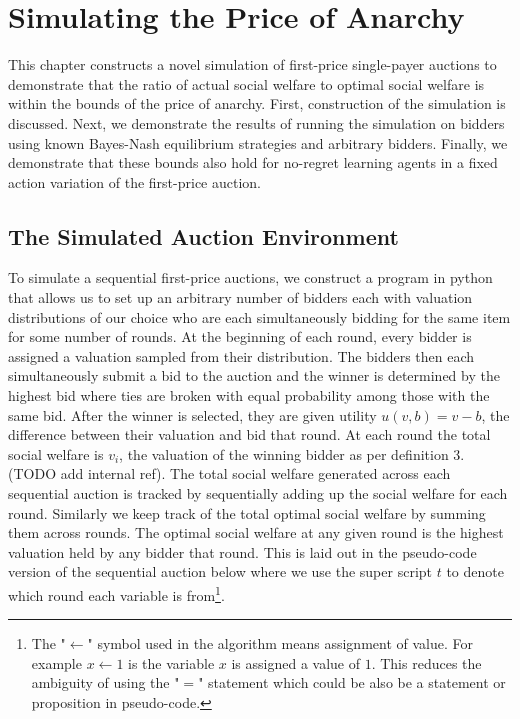 \documentclass[12pt,twoside]{reedthesis}
\begin{document}
\chapter{Simulating the Price of Anarchy}

This chapter constructs a novel simulation of first-price single-payer auctions to demonstrate that the ratio of actual social welfare to optimal social welfare is within the bounds of the price of anarchy. First, construction of the simulation is discussed. Next, we demonstrate the results of running the simulation on bidders using known Bayes-Nash equilibrium strategies and arbitrary bidders. Finally, we demonstrate that these bounds also hold for no-regret learning agents in a fixed action variation of the first-price auction.

\section{The Simulated Auction Environment}

To simulate a sequential first-price auctions, we construct a program in python that allows us to set up an arbitrary number of bidders each with valuation distributions of our choice who are each simultaneously bidding for the same item for some number of rounds. At the beginning of each round, every bidder is assigned a valuation sampled from their distribution. The bidders then each simultaneously submit a bid to the auction and the winner is determined by the highest bid where ties are broken with equal probability among those with the same bid. After the winner is selected, they are given utility $u(v, b) = v - b$, the difference between their valuation and bid that round. At each round the total social welfare is $v_i$, the valuation of the winning bidder as per definition 3. (TODO add internal ref). The total social welfare generated across each sequential auction is tracked by sequentially adding up the social welfare for each round. Similarly we keep track of the total optimal social welfare by summing them across rounds. The optimal social welfare at any given round is the highest valuation held by any bidder that round. This is laid out in the pseudo-code version of the sequential auction below where we use the super script $t$ to denote which round each variable is from\footnote{The "$\leftarrow$" symbol used in the algorithm means assignment of value. For example $x \leftarrow 1$ is the variable $x$ is assigned a value of $1$. This reduces the ambiguity of using the "$=$" statement which could be also be a statement or proposition in pseudo-code.}.\\
\end{document}

